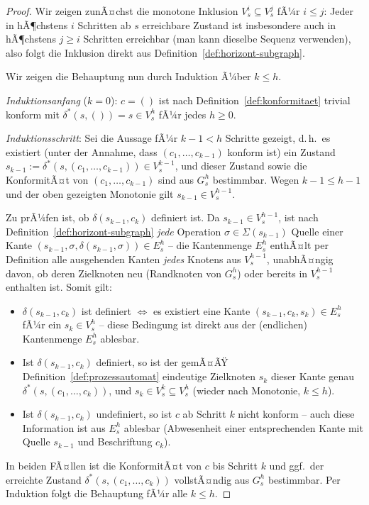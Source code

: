 ﻿\documentclass[a4paper,12pt]{article}
\theoremstyle{definition}
\begin{document}
\begin{proof}
	Wir zeigen zunÃ¤chst die monotone Inklusion $V_s^i\subseteq V_s^j$ fÃ¼r $i\le j$: Jeder
	in hÃ¶chstens $i$ Schritten ab $s$ erreichbare Zustand ist insbesondere auch in
	hÃ¶chstens $j\ge i$ Schritten erreichbar (man kann dieselbe Sequenz verwenden), also
	folgt die Inklusion direkt aus Definition~\ref{def:horizont-subgraph}.

	Wir zeigen die Behauptung nun durch Induktion Ã¼ber $k\le h$.

	\emph{Induktionsanfang} ($k=0$): $c=()$ ist nach Definition~\ref{def:konformitaet}
	trivial konform mit $\delta^{*}(s,())=s\in V_s^h$ fÃ¼r jedes $h\ge0$.

	\emph{Induktionsschritt}: Sei die Aussage fÃ¼r $k-1<h$ Schritte gezeigt, d.\,h.\ es
	existiert (unter der Annahme, dass $(c_1,\ldots,c_{k-1})$ konform ist) ein Zustand
	$s_{k-1}:=\delta^{*}(s,(c_1,\ldots,c_{k-1}))\in V_s^{k-1}$, und dieser Zustand sowie
	die KonformitÃ¤t von $(c_1,\ldots,c_{k-1})$ sind aus $G_s^h$ bestimmbar. Wegen
	$k-1\le h-1$ und der oben gezeigten Monotonie gilt $s_{k-1}\in V_s^{h-1}$.

	Zu prÃ¼fen ist, ob $\delta(s_{k-1},c_k)$ definiert ist. Da $s_{k-1}\in V_s^{h-1}$, ist
	nach Definition~\ref{def:horizont-subgraph} \emph{jede} Operation
	$\sigma\in\Sigma(s_{k-1})$ Quelle einer Kante
	$(s_{k-1},\sigma,\delta(s_{k-1},\sigma))\in E_s^h$ -- die Kantenmenge $E_s^h$
	enthÃ¤lt per Definition alle ausgehenden Kanten \emph{jedes} Knotens aus
	$V_s^{h-1}$, unabhÃ¤ngig davon, ob deren Zielknoten neu (Randknoten von $G_s^h$)
	oder bereits in $V_s^{h-1}$ enthalten ist. Somit gilt:
	\begin{itemize}
		\item $\delta(s_{k-1},c_k)$ ist definiert $\iff$ es existiert eine Kante
		      $(s_{k-1},c_k,s_k)\in E_s^h$ fÃ¼r ein $s_k\in V_s^h$ -- diese Bedingung ist
		      direkt aus der (endlichen) Kantenmenge $E_s^h$ ablesbar.
		\item Ist $\delta(s_{k-1},c_k)$ definiert, so ist der gemÃ¤ÃŸ
		      Definition~\ref{def:prozessautomat} eindeutige Zielknoten $s_k$ dieser
		      Kante genau $\delta^{*}(s,(c_1,\ldots,c_k))$, und $s_k\in V_s^{k}\subseteq
		      V_s^h$ (wieder nach Monotonie, $k\le h$).
		\item Ist $\delta(s_{k-1},c_k)$ undefiniert, so ist $c$ ab Schritt $k$ nicht
		      konform -- auch diese Information ist aus $E_s^h$ ablesbar (Abwesenheit
		      einer entsprechenden Kante mit Quelle $s_{k-1}$ und Beschriftung $c_k$).
	\end{itemize}
	In beiden FÃ¤llen ist die KonformitÃ¤t von $c$ bis Schritt $k$ und ggf.\ der erreichte
	Zustand $\delta^{*}(s,(c_1,\ldots,c_k))$ vollstÃ¤ndig aus $G_s^h$ bestimmbar. Per
	Induktion folgt die Behauptung fÃ¼r alle $k\le h$. \qedhere
\end{proof}
\end{document}
